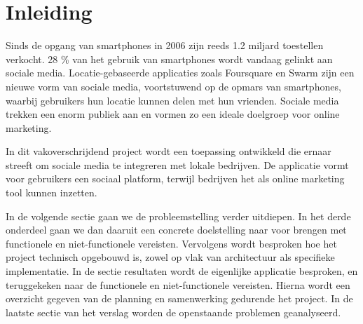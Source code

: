 \chapter{Inleiding}

Sinds de opgang van smartphones in 2006 zijn reeds 1.2 miljard toestellen verkocht\cite{smartphone_sales}. 28 \% van het gebruik van smartphones wordt vandaag gelinkt aan sociale media. Locatie-gebaseerde applicaties zoals Foursquare\cite{foursquare} en Swarm\cite{swarm} zijn een nieuwe vorm van sociale media, voortstuwend op de opmars van smartphones, waarbij gebruikers hun locatie kunnen delen met hun vrienden.
Sociale media trekken een enorm publiek aan en vormen zo een ideale doelgroep voor online marketing. 

In dit vakoverschrijdend project wordt een toepassing ontwikkeld die ernaar streeft om sociale media te integreren met lokale bedrijven.
De applicatie vormt voor gebruikers een sociaal platform, terwijl bedrijven het als online marketing tool kunnen inzetten.

In de volgende sectie gaan we de probleemstelling verder uitdiepen. In het derde onderdeel  gaan we dan daaruit een concrete doelstelling naar voor brengen met functionele en niet-functionele vereisten. Vervolgens wordt besproken hoe het project technisch opgebouwd is, zowel op vlak van architectuur als specifieke implementatie. In de sectie resultaten wordt de eigenlijke applicatie besproken, en teruggekeken naar de functionele en niet-functionele vereisten. Hierna wordt een overzicht gegeven van de planning en samenwerking gedurende het project. In de laatste sectie van het verslag worden de openstaande problemen geanalyseerd.